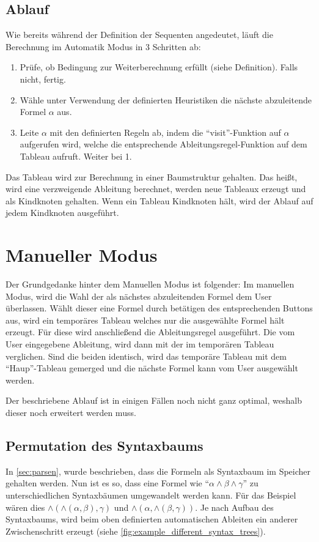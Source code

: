 \subsection{Ablauf}
Wie bereits während der Definition der Sequenten angedeutet, läuft die Berechnung im Automatik Modus in 3 Schritten ab:

\begin{enumerate}
\item Prüfe, ob Bedingung zur Weiterberechnung erfüllt (siehe Definition). Falls nicht, fertig.

\item Wähle unter Verwendung der definierten Heuristiken die nächste abzuleitende Formel $\alpha$ aus.

\item Leite $\alpha$ mit den definierten Regeln ab, indem die ``visit''-Funktion auf $\alpha$ aufgerufen wird, welche die entsprechende Ableitungsregel-Funktion auf dem Tableau aufruft. Weiter bei 1.
\end{enumerate}

Das Tableau wird zur Berechnung in einer Baumstruktur gehalten. Das heißt, wird eine verzweigende Ableitung berechnet, werden neue Tableaux erzeugt und als Kindknoten gehalten. Wenn ein Tableau Kindknoten hält, wird der Ablauf auf jedem Kindknoten ausgeführt.

\section{Manueller Modus}
Der Grundgedanke hinter dem Manuellen Modus ist folgender: Im manuellen Modus, wird die Wahl der als nächstes abzuleitenden Formel dem User überlassen. Wählt dieser eine Formel durch betätigen des entsprechenden Buttons aus, wird ein temporäres Tableau welches nur die ausgewählte Formel hält erzeugt. Für diese wird anschließend die Ableitungsregel ausgeführt. Die vom User eingegebene Ableitung, wird dann mit der im temporären Tableau verglichen. Sind die beiden identisch, wird das temporäre Tableau mit dem ``Haup''-Tableau gemerged und die nächste Formel kann vom User ausgewählt werden.

Der beschriebene Ablauf ist in einigen Fällen noch nicht ganz optimal, weshalb dieser noch erweitert werden muss.

\subsection{Permutation des Syntaxbaums}
In \autoref{sec:parsen}, wurde beschrieben, dass die Formeln als Syntaxbaum im Speicher gehalten werden. Nun ist es so, dass eine Formel wie ``$\alpha\wedge\beta\wedge\gamma$'' zu unterschiedlichen Syntaxbäumen umgewandelt werden kann. Für das Beispiel wären dies $\wedge(\wedge(\alpha,\beta),\gamma)$ und $\wedge(\alpha,\wedge(\beta,\gamma))$. Je nach Aufbau des Syntaxbaums, wird beim oben definierten automatischen Ableiten ein anderer Zwischenschritt erzeugt (siehe \autoref{fig:example_different_syntax_trees}).

